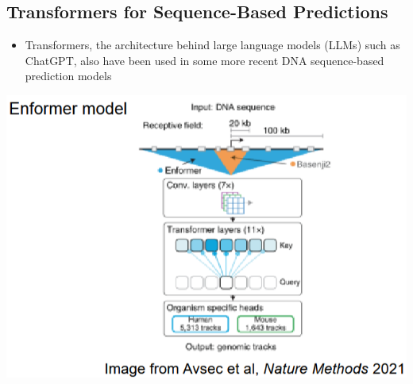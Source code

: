 \documentclass[10pt]{article}
\begin{document}
\subsection*{Transformers for Sequence-Based Predictions}
\begin{itemize}
	\item Transformers, the architecture behind large language models (LLMs) such as ChatGPT, also have been used in some more recent DNA sequence-based prediction models
\end{itemize}
\begin{center} 
	\includegraphics*[scale=0.8]{W8_26.png} 
\end{center}
\end{document}
